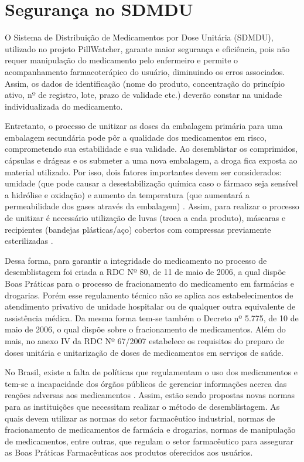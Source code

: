 \section{Segurança no SDMDU}

O Sistema de Distribuição de Medicamentos por Dose Unitária (SDMDU), utilizado no projeto PillWatcher, garante maior segurança e eficiência, pois não requer manipulação do medicamento pelo enfermeiro e permite o acompanhamento farmacoterápico do usuário, diminuindo os erros associados. Assim, os dados de identificação (nome do produto, concentração do princípio ativo, nº de registro, lote, prazo de validade etc.) deverão constar na unidade individualizada do medicamento.

Entretanto, o processo de unitizar as doses da embalagem primária para uma embalagem secundária pode pôr a qualidade dos medicamentos em risco, comprometendo sua estabilidade e sua validade. Ao desemblistar os comprimidos, cápsulas e drágeas e os submeter a uma nova embalagem, a droga fica exposta ao material utilizado. Por isso, dois fatores importantes devem ser considerados: umidade (que pode causar a desestabilização química caso o fármaco seja sensível a hidrólise e oxidação) e aumento da temperatura (que aumentará a permeabilidade dos gases através da embalagem) \cite{Jara_2012}. Assim, para realizar o processo de unitizar é necessário utilização de luvas (troca a cada produto), máscaras e recipientes (bandejas plásticas/aço) cobertos com compressas previamente esterilizadas \cite{Everton_2012}. 

Dessa forma, para garantir a integridade do medicamento no processo de desemblistagem foi criada a RDC Nº 80, de 11 de maio de 2006, a qual dispõe Boas Práticas para o processo de fracionamento do medicamento em farmácias e drogarias. Porém esse regulamento técnico não se aplica aos estabelecimentos de atendimento privativo de unidade hospitalar ou de qualquer outra equivalente de assistência médica. Da mesma forma tem-se também o Decreto nº 5.775, de 10 de maio de 2006, o qual dispõe sobre o fracionamento de medicamentos. Além do mais, no anexo IV da RDC Nº 67/2007 estabelece os requisitos do preparo de doses unitária e unitarização de doses de medicamentos em serviços de saúde.

No Brasil, existe a falta de políticas que regulamentam o uso dos medicamentos e tem-se a incapacidade dos órgãos públicos de gerenciar informações acerca das reações adversas aos medicamentos \cite{Jara_2012}. Assim, estão sendo propostas novas normas para as instituições que necessitam realizar o método de desemblistagem. As quais devem utilizar as normas do setor farmacêutico industrial, normas de fracionamento de medicamentos de farmácia e drogarias, normas de manipulação de medicamentos, entre outras, que regulam o setor farmacêutico para assegurar as Boas Práticas Farmacêuticas aos produtos oferecidos aos usuários. 




